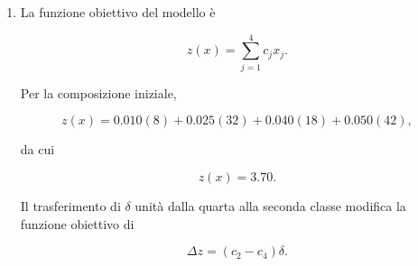 \begin{enumerate}
\[
L(x)+\Delta L
=
Q_{\min}.
\]

Quindi

\[
L(x)
+
(q_2-q_4)\delta
=
Q_{\min}.
\]

Risolvendo rispetto a \(\delta\),

\[
\delta
=
\frac{Q_{\min}-L(x)}
{q_2-q_4}.
\]

Sostituendo i dati,

\[
\delta
=
\frac{55-54.2}
{0.90-0.20}
=
\frac{0.8}{0.70}
\approx
1.143.
\]

La nuova composizione \`e pertanto

\[
x^{\mathrm{new}}
\approx
\begin{pmatrix}
8\\
33.143\\
18\\
40.857
\end{pmatrix}.
\]

Per costruzione,

\[
L(x^{\mathrm{new}})
=
Q_{\min}
=
55.
\]

Occorre inoltre verificare che la correzione non produca la violazione del
vincolo di stress.

La variazione della perdita \`e

\[
\Delta S
=
(\ell_2-\ell_4)\delta.
\]

Poich\'e

\[
\ell_2-\ell_4
=
0.02-0.08
=
-0.06,
\]

\noindent si ha

\[
\Delta S
=
-0.06(1.143)
\approx
-0.069.
\]

La nuova perdita \`e quindi

\[
S(x^{\mathrm{new}})
=
S(x)+\Delta S
\approx
6.70-0.069
=
6.631.
\]

Il limite \(K=7\) continua pertanto a essere rispettato.

\item La funzione obiettivo del modello \`e

\[
z(x)
=
\sum_{j=1}^{4}c_jx_j.
\]

Per la composizione iniziale,

\[
z(x)
=
0.010(8)
+
0.025(32)
+
0.040(18)
+
0.050(42),
\]

\noindent da cui

\[
z(x)
=
3.70.
\]

Il trasferimento di \(\delta\) unit\`a dalla quarta alla seconda classe
modifica la funzione obiettivo di

\[
\Delta z
=
(c_2-c_4)\delta.
\]


\end{enumerate}
